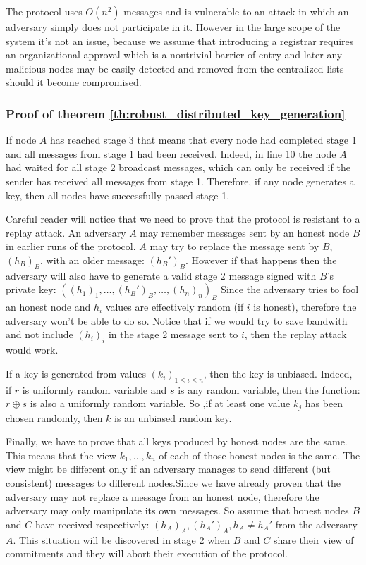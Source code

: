 The protocol uses $O\left(n^2\right)$ messages and is vulnerable to an attack in
which an adversary simply does not participate in it. However in the large scope
of the system it's not an issue, because we assume that introducing a registrar
requires an organizational approval which is a nontrivial barrier of entry and
later any malicious nodes may be easily detected and removed from the
centralized lists should it become compromised.

\subsubsection{Proof of theorem \ref{th:robust_distributed_key_generation}}

If node $A$ has reached stage 3 that means that every node had completed stage 1
and all messages from stage 1 had been received. Indeed, in line 10 the node $A$
had waited for all stage 2 broadcast messages, which can only be received if
the sender has received all messages from stage 1.
Therefore, if any node generates a key, then all nodes have successfully passed
stage 1.

Careful reader will notice that we need to prove that the protocol is resistant
to a replay attack. An adversary $A$ may remember messages sent by an honest
node $B$ in earlier runs of the protocol. $A$ may try to replace the message
sent by $B$, $\left(h_B\right)_B$, with an older message: $\left(h_B'\right)_B$.
However if that happens then the adversary will also have to generate a valid
stage 2 message signed with $B$'s private key: 
$\left(\left(h_1\right)_1, \ldots, \left(h_B'\right)_B, \ldots,
\left(h_n\right)_n\right)_B$
Since the adversary tries to fool an honest node and $h_i$ values are
effectively random (if $i$ is honest), therefore the adversary won't be able to
do so.
Notice that if we would try to save bandwith and not include
$\left(h_i\right)_i$ in the stage 2 message sent to $i$, then the replay attack
would work.

If a key is generated from values $\left(k_i\right)_{1 \leq i \leq n}$, then the
key is unbiased. Indeed, if $r$ is uniformly random variable and $s$ is any
random variable, then the function: $r \oplus s$ is also a uniformly random
variable. So ,if at least one value $k_j$ has been chosen randomly, then $k$ is
an unbiased random key.

Finally, we have to prove that all keys produced by honest nodes are the same.
This means that the view $k_1, \ldots, k_n$ of each of those honest nodes is the
same. The view might be different only if an adversary manages to send different
(but consistent) messages to different nodes.Since we have already proven that the
adversary may not replace a message from an honest node, therefore the adversary
may only manipulate its own messages. So assume that honest nodes $B$
and $C$ have received respectively: $\left(h_A\right)_A, \left(h_A'\right)_A,
h_A \neq h_A'$ from the adversary $A$.
This situation will be discovered in stage $2$ when $B$ and $C$ share their view
of commitments and they will abort their execution of the protocol.

